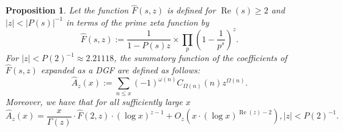\documentclass[11pt,reqno,a4letter]{article}
\numberwithin{figure}{section}
\numberwithin{table}{section}
\theoremstyle{plain}
\newtheorem{prop}[theorem]{Proposition}
\numberwithin{theorem}{section}
\theoremstyle{definition}
\renewcommand{\Re}{\operatorname{Re}}
\begin{document}
\begin{prop} 
\label{prop_HatAzx_ModSummatoryFuncExps_RelatedToCkn} 
Let the function $\widehat{F}(s, z)$ is defined for $\Re(s) \geq 2$ and $|z| < |P(s)|^{-1}$ 
in terms of the prime zeta function by 
\[
\widehat{F}(s, z) := \frac{1}{1-P(s) z} 
     \times \prod_p \left(1 - \frac{1}{p^s}\right)^{z}. 
\]
For $|z| < P(2)^{-1} \approx 2.21118$, the 
summatory function of the coefficients of 
$\widehat{F}(s, z)$ expanded as a DGF are defined as follows: 
\[
\widehat{A}_z(x) := \sum_{n \leq x} (-1)^{\omega(n)} 
     C_{\Omega(n)}(n) z^{\Omega(n)}. 
\]
Moreover, we have that for all sufficiently large $x$ 
\[
\widehat{A}_z(x) = \frac{x}{\Gamma(z)} \cdot \widehat{F}(2, z) \cdot (\log x)^{z-1} + 
     O_{z}\left(x \cdot (\log x)^{\Re(z) - 2}\right), |z| < P(2)^{-1}. 
\]
\end{prop} 
\end{document}
